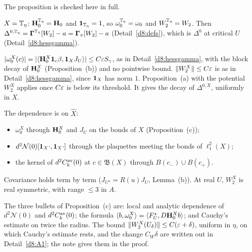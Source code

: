 \begin{detail}\label{d8:dh}
The proposition is checked here in full.
\begin{step}[(a)]
$X=\mathbb T_\eta$: $\mathbf H^{\mathbb T_\eta}_0=\mathbf H_0$ and $\mathbf 1_{\mathbb T_\eta}=1$, so $\omega_0^{\mathbb T_\eta}=\omega_0$ and $W_2^{\mathbb T_\eta}=W_2$. Then $\Delta^{0,\mathbb T_\eta}=\boldsymbol\Gamma^{\mathbb T_\eta}[W_2]-a=\boldsymbol\Gamma_\pi[W_2]-a$ (Detail~\ref{d8:defs}), which is $\Delta^0$ at critical $U$ (Detail~\ref{d8:hessgamma}).
\end{step}
\begin{step}[(b)]
$|\omega_0^X(c)|=|\langle \mathbf H_0^X\mathbf 1_c\beta,\mathbf 1_XJ_U\rangle|\le C\varepsilon S_\gamma$, as in Detail~\ref{d8:hessgamma}, with the block decay of $\mathbf H_0^X$ (Proposition~(b)) and no pointwise bound. $\|W_2^X\|\le C\varepsilon$ is as in Detail~\ref{d8:hessgamma}, since $\mathbf 1_X$ has norm $1$. Proposition~(a) with the potential $W_2^X$ applies once $C\varepsilon$ is below its threshold. It gives the decay of $\Delta^{0,X}$, uniformly in $X$.
\end{step}
\begin{step}
The dependence is on $\hat X$:
\begin{itemize}
\item $\omega_0^X$ through $\mathbf H_0^X$ and $J_U$ on the bonds of $X$ (Proposition~(c));
\item $d^2\mathcal N(0)[\mathbf 1_X\cdot,\mathbf 1_X\cdot]$ through the plaquettes meeting the bonds of $\ell^2_1(X)$;
\item the kernel of $d^2C^{\rm av}_k(0)$ at $c\in\mathfrak B(X)$ through $B(c_-)\cup B(c_+)$.
\end{itemize}
Covariance holds term by term ($J_{U^u}=R(u)J_U$, Lemma~(b)). At real $U$, $W_2^X$ is real symmetric, with range $\le3$ in $A$.
\end{step}
\begin{step}
The three bullets of Proposition~(c) are: local and analytic dependence of $d^2\mathcal N(0)$ and $d^2C^{\rm av}_k(0)$; the formula $\langle b,\omega^X_0\rangle=\langle F^s_U,D\mathbf H_0^Xb\rangle$; and Cauchy's estimate on twice the radius. The bound $\|W_2^X(U_\delta)\|\le C(\varepsilon+\delta)$, uniform in $\eta$, on which Cauchy's estimate rests, and the change $C_W\delta$ are written out in Detail~\ref{d8:A1}; the note gives them in the proof.
\end{step}
\end{detail}

